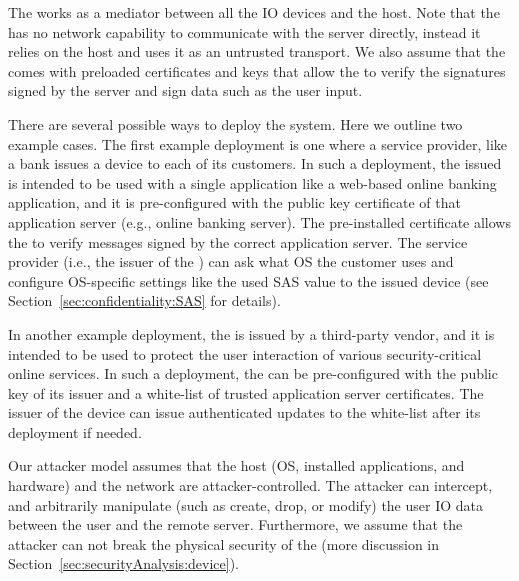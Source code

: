 The \device works as a mediator between all the IO devices and the host. Note that the \device has no network capability to communicate with the server directly, instead it relies on the host and uses it as an untrusted transport. We also assume that the \device comes with preloaded certificates and keys that allow the \device to verify the signatures signed by the server and sign data such as the user input.

There are several possible ways to deploy the \name system. Here we outline two example cases. The first example deployment is one where a service provider, like a bank issues a \device device to each of its customers. In such a deployment, the issued \device is intended to be used with a single application like a web-based online banking application, and it is pre-configured with the public key certificate of that application server (e.g., online banking server). The pre-installed certificate allows the \device to verify messages signed by the correct application server. The service provider (i.e., the issuer of the \device) can ask what OS the customer uses and configure OS-specific settings like the used SAS value to the issued device (see Section~\ref{sec:confidentiality:SAS} for details). 

In another example deployment, the \device is issued by a third-party vendor, and it is intended to be used to protect the user interaction of various security-critical online services. In such a deployment, the \device can be pre-configured with the public key of its issuer and a white-list of trusted application server certificates. The issuer of the device can issue authenticated updates to the white-list after its deployment if needed.

 Our attacker model assumes that the host (OS, installed applications, and hardware) and the network are attacker-controlled. The attacker can intercept, and arbitrarily manipulate (such as create, drop, or modify) the user IO data between the user and the remote server. Furthermore, we assume that the attacker can not break the physical security of the \device (more discussion in Section~\ref{sec:securityAnalysis:device}).



